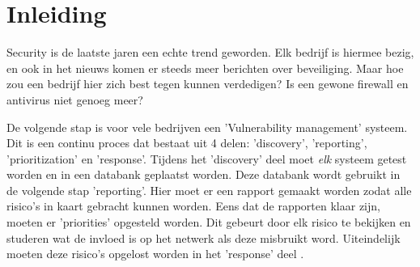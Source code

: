
\chapter{Inleiding}
\label{ch:inleiding}

Security is de laatste jaren een echte trend geworden. Elk bedrijf is hiermee bezig, en ook in het nieuws komen er steeds meer berichten over beveiliging. Maar hoe zou een bedrijf hier zich best tegen kunnen verdedigen? Is een gewone firewall en antivirus niet genoeg meer?

De volgende stap is voor vele bedrijven een 'Vulnerability management' systeem. Dit is een continu proces dat bestaat uit 4 delen:  'discovery', 'reporting', 'prioritization' en 'response'. Tijdens het 'discovery' deel moet \emph{elk} systeem getest worden en in een databank geplaatst worden. Deze databank wordt gebruikt in de volgende stap 'reporting'. Hier moet er een rapport gemaakt worden zodat alle risico's in kaart gebracht kunnen worden. Eens dat de rapporten klaar zijn, moeten er 'priorities' opgesteld worden. Dit gebeurt door elk risico te bekijken en studeren wat de invloed is op het netwerk als deze misbruikt word. Uiteindelijk moeten deze risico's opgelost worden in het 'response' deel \autocite{Tripwire}.

